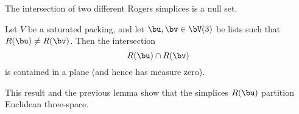 
The intersection of two different Rogers simplices is a null set.

\begin{lemma}  \label{lemma:R-inter} 
Let $V$ be a saturated packing, and let $\bu,\bv\in \bV(3)$ be lists such that 
$R(\bu)\ne R(\bv)$.  Then the intersection 
\begin{displaymath} 
R(\bu)\cap R(\bv)
\end{displaymath}
is contained in a plane (and hence has measure zero).
\end{lemma}

This result and the previous lemma show that the simplices $R(\bu)$
partition Euclidean three-space.

